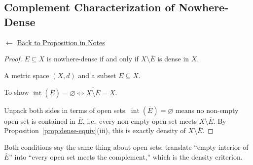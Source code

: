 
\subsection*{Complement Characterization of Nowhere-Dense}
\label{prf:nowhere-dense-equiv}

\begin{remark*}[Return]
$\leftarrow$ \hyperref[prop:nowhere-dense-equiv]{Back to Proposition in Notes}
\end{remark*}

\begin{proof}
\Claim $E \subseteq X$ is nowhere-dense if and only if
$X \setminus \overline{E}$ is dense in $X$.

\Given A metric space $(X,d)$ and a subset $E \subseteq X$.

\Goal To show $\operatorname{int}(\overline{E}) = \varnothing
\iff \overline{X \setminus \overline{E}} = X$.

\Strategy Unpack both sides in terms of open sets.
$\operatorname{int}(\overline{E}) = \varnothing$ means no non-empty open set
is contained in $\overline{E}$, i.e.\ every non-empty open set meets $X \setminus \overline{E}$.
By Proposition~\ref{prop:dense-equiv}(iii), this is exactly density of $X \setminus \overline{E}$.


\end{proof}

\begin{remark*}
Both conditions say the same thing about open sets: translate
``empty interior of $\overline{E}$'' into ``every open set meets the complement,''
which is the density criterion.

\end{remark*}

